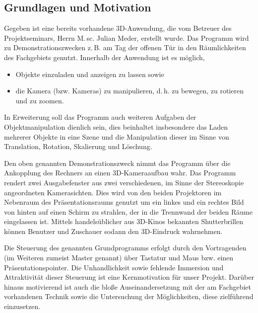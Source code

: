 \subsection{Grundlagen und Motivation}
	Gegeben ist eine bereits vorhandene 3D-Anwendung, die vom Betreuer des Projektseminars, Herrn M.\,sc. Julian Meder, erstellt wurde. Das Programm wird zu Demonstrationszwecken z.\,B. am Tag der offenen Tür in den Räumlichkeiten des Fachgebiets genutzt. Innerhalb der Anwendung ist es möglich,
	\begin{itemize}
		\item Objekte einzuladen und anzeigen zu lassen sowie
		\item die Kamera (bzw. Kameras) zu manipulieren, d.\,h. zu bewegen, zu rotieren und zu zoomen.
	\end{itemize}
	In Erweiterung soll das Programm auch weiteren Aufgaben der Objektmanipulation dienlich sein, dies beinhaltet insbesondere das Laden mehrerer Objekte in eine Szene und die Manipulation dieser im Sinne von Translation, Rotation, Skalierung und Löschung.\par
	Den oben genannten Demonstrationszweck nimmt das Programm über die Ankopplung des Rechners an einen 3D-Kameraaufbau wahr. Das Programm rendert zwei Ausgabefenster aus zwei verschiedenen, im Sinne der Stereoskopie angeordneten Kamerasichten. Dies wird von den beiden Projektoren im Nebenraum des Präsentationsraums genutzt um ein linkes und ein rechtes Bild von hinten auf einen Schirm zu strahlen, der in die Trennwand der beiden Räume eingelassen ist. Mittels handelsüblicher aus 3D-Kinos bekannten Shutterbrillen können Benutzer und Zuschauer sodann den 3D-Eindruck wahrnehmen.\par
	Die Steuerung des genannten Grundprogramms erfolgt durch den Vortragenden (im Weiteren zumeist Master genannt) über Tastatur und Maus bzw. einen Präsentationspointer. Die Unhandlichkeit sowie fehlende Immersion und Attraktivität dieser Steuerung ist eine Kernmotivation für unser Projekt. Darüber hinaus motivierend ist auch die bloße Auseinandersetzung mit der am Fachgebiet vorhandenen Technik sowie die Untersuchung der Möglichkeiten, diese zielführend einzusetzen.